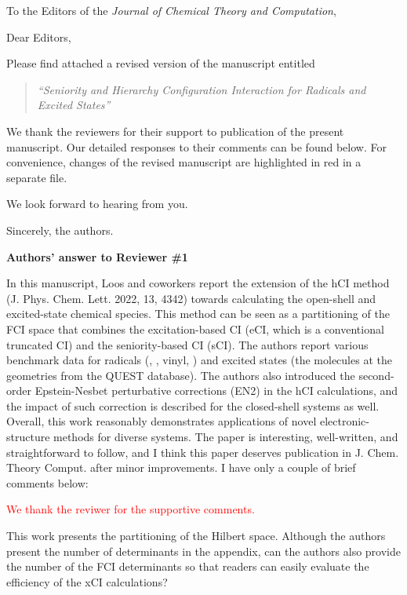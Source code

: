 \documentclass[10pt]{letter}
\newcommand{\alert}[1]{\textcolor{red}{#1}}
\begin{document}
\begin{letter}%
{To the Editors of the \textit{Journal of Chemical Theory and Computation},}

\opening{Dear Editors,}

\justifying
Please find attached a revised version of the manuscript entitled
\begin{quote}
	\textit{``Seniority and Hierarchy Configuration Interaction for Radicals and Excited States''}
\end{quote}

We thank the reviewers for their support to publication of the present manuscript.
Our detailed responses to their comments can be found below.
For convenience, changes of the revised manuscript are highlighted in red in a separate file.

We look forward to hearing from you.

\closing{Sincerely, the authors.}

\newpage

\noindent \textbf{\large Authors' answer to Reviewer \#1}

{In this manuscript, Loos and coworkers report the extension of the hCI method (J. Phys. Chem. Lett. 2022, 13, 4342) towards calculating the open-shell and excited-state chemical species. 
This method can be seen as a partitioning of the FCI space that combines the excitation-based CI (eCI, which is a conventional truncated CI) and the seniority-based CI (sCI).
The authors report various benchmark data for radicals (, , vinyl, ) and excited states (the molecules at the geometries from the QUEST database).
The authors also introduced the second-order Epstein-Nesbet perturbative corrections (EN2) in the hCI calculations,
and the impact of such correction is described for the closed-shell systems as well.
Overall, this work reasonably demonstrates applications of novel electronic-structure methods for diverse systems. 
The paper is interesting, well-written, and straightforward to follow, and I think this paper deserves publication in J. Chem. Theory Comput. after minor improvements. 
I have only a couple of brief comments below:
}

\alert{
We thank the reviwer for the supportive comments.
}


{This work presents the partitioning of the Hilbert space. Although the authors present the number
of determinants in the appendix, can the authors also provide the number of the FCI determinants
so that readers can easily evaluate the efficiency of the xCI calculations?
}


\end{letter}
\end{document}
